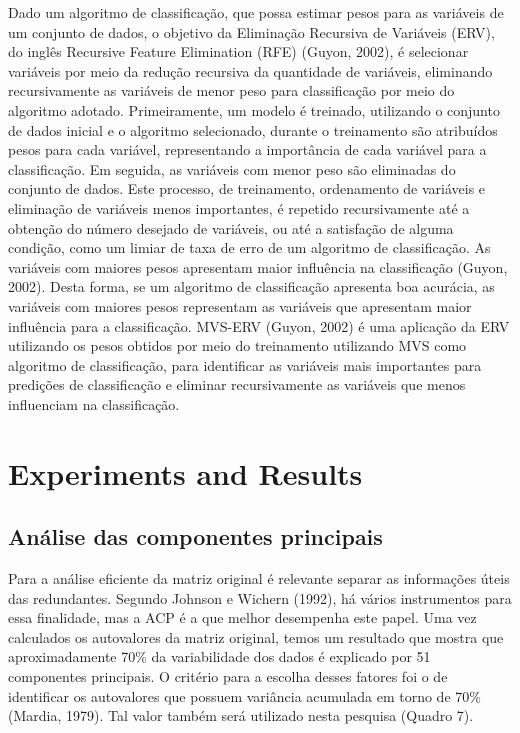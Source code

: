 Dado um algoritmo de classificação, que possa estimar pesos para as variáveis de um conjunto de dados, o objetivo da Eliminação Recursiva de Variáveis (ERV), do inglês Recursive Feature Elimination (RFE) (Guyon, 2002), é selecionar variáveis por meio da redução recursiva da quantidade de variáveis, eliminando recursivamente as variáveis de menor peso para classificação por meio do algoritmo adotado. 
Primeiramente, um modelo é treinado, utilizando o conjunto de dados inicial e o algoritmo selecionado, durante o treinamento são atribuídos pesos para cada variável, representando a importância de cada variável para a classificação. Em seguida, as variáveis com menor peso são eliminadas do conjunto de dados. Este processo, de treinamento, ordenamento de variáveis e eliminação de variáveis menos importantes, é repetido recursivamente até a obtenção do número desejado de variáveis, ou até a satisfação de alguma condição, como um limiar de taxa de erro de um algoritmo de classificação.
As variáveis com maiores pesos apresentam maior influência na classificação (Guyon, 2002). Desta forma, se um algoritmo de classificação apresenta boa acurácia, as variáveis com maiores pesos representam as variáveis que apresentam maior influência para a classificação.
MVS-ERV (Guyon, 2002) é uma aplicação da ERV utilizando os pesos obtidos por meio do treinamento utilizando MVS como algoritmo de classificação, para identificar as variáveis mais importantes para predições de classificação e eliminar recursivamente as variáveis que menos influenciam na classificação.

\section{Experiments and Results}
\label{sec:experimentalresults}

\subsection{Análise das componentes principais}

Para a análise eficiente da matriz original  é relevante separar as informações úteis das redundantes. Segundo Johnson e Wichern (1992), há vários instrumentos para essa finalidade, mas a ACP é a que melhor desempenha este papel. 
Uma vez calculados os autovalores da matriz original, temos um resultado que mostra que aproximadamente 70\% da variabilidade dos dados é explicado por 51 componentes principais. O critério para a escolha desses fatores foi o de identificar os autovalores que possuem variância acumulada em torno de 70\% (Mardia, 1979). Tal valor também será utilizado nesta pesquisa (Quadro 7). 


